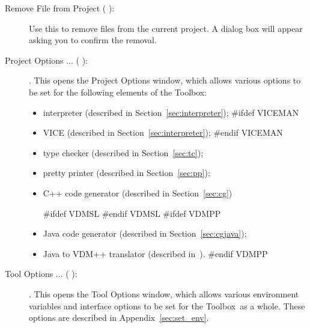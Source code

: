 \documentclass[\pformat,12pt]{article}
\newcommand{\Toolbox}{Toolbox}
\newcommand{\Toolbox}{Toolbox}
\newcommand{\guicmd}[1]{{\sf #1}}
\newcommand{\guicmd}[1]{{\gt #1}}
\begin{document}
\begin{description}
\item[\guicmd{Remove File from Project} (\hspace{-1.5mm}
 ):]
 Use this to remove files from
 the current project. A dialog box will appear asking you to confirm
 the removal. 

\item[\guicmd{Project Options ...} (\hspace{-1.5mm}
):].
  This opens the \guicmd{Project Options} window, which allows various options
  to be set for the following elements of the \Toolbox:
  \begin{itemize}
    \item \guicmd{interpreter} (described in
  Section~\ref{sec:interpreter});
#ifdef VICEMAN
    \item \guicmd{VICE} (described in
  Section~\ref{sec:interpreter});
#endif VICEMAN
    \item \guicmd{type checker}  (described in Section~\ref{sec:tc});
    \item \guicmd{pretty printer}  (described in Section~\ref{sec:pp});
    \item \guicmd{C++ code generator} (described in Section~\ref{sec:cg})%

#ifdef VDMSL
#endif VDMSL
#ifdef VDMPP
    \item \guicmd{Java code generator}  (described in Section~\ref{sec:cgjava});
    \item \guicmd{Java to VDM++ translator}  (described in~\cite{Java2VDMMan-SCSK}). 
#endif VDMPP
  \end{itemize}

\item[\guicmd{Tool Options ...} (\hspace{-1.5mm}
):].
  This opens the \guicmd{Tool Options} window, which allows various
  environment variables and interface options to be set for the
  \Toolbox\ as a whole. These options are described in
  Appendix~\ref{sec:set_env}. 


\end{description}
\end{document}
